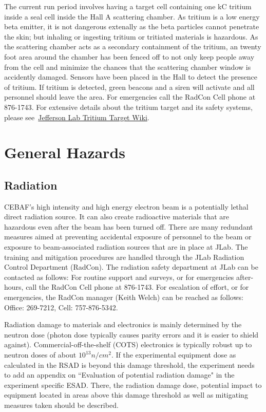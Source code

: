 The current run period involves having a target cell containing one kC tritium inside a seal cell
inside the Hall A scattering
chamber.    As tritium is a low energy beta emitter, it is not dangerous extenally as the beta particles 
cannot penetrate the skin; but inhaling or ingesting tritium or tritiated materials is hazardous. 
As the scattering chamber acts as a secondary containment of the tritium, an twenty foot area around
the chamber has been fenced off to not only keep people away from the cell and minimize the chances
that the scattering chamber window is accidently damaged.
Sensors have been placed in the Hall to detect the presence of tritium.   If tritium is detected,
green beacons and a siren will activate and all personnel should leave the area.   
For emergencies call the RadCon Cell phone at 876-1743.   For extensive details about the tritium
target and its safety systems, please 
see~\href{https://wiki.jlab.org/jlab_tritium_target_wiki/index.php/Main_Page}{Jefferson Lab Tritium Target Wiki}.


\chapter{General Hazards}

\section{Radiation}
	
CEBAF's high intensity and high energy electron beam is a potentially lethal direct radiation source. 
It can also create radioactive materials that are hazardous even  after the beam has been turned off. 
There are many redundant measures aimed at preventing accidental exposure of personnel to the beam 
or exposure to beam-associated radiation sources that are in place at JLab. The training and mitigation 
procedures are handled through the JLab Radiation Control Department (RadCon). The radiation safety 
department at JLab can be contacted as follows: For routine support and surveys, or for emergencies 
after-hours, call the RadCon Cell phone at 876-1743. For escalation of effort, or for emergencies, 
the RadCon manager (Keith Welch) can be reached as follows: Office: 269-7212, Cell: 757-876-5342.

Radiation damage to materials and electronics is mainly determined by the neutron 
dose (photon dose typically causes parity errors and it is easier to shield against). 
Commercial-off-the-shelf (COTS) electronics is typically robust up to neutron 
doses of about $10^{13} n/cm^2$. If the experimental equipment dose as calculated 
in the RSAD is beyond this damage threshold, the experiment needs to add 
an appendix on ``Evaluation of potential radiation damage" in the experiment 
specific ESAD. There, the radiation damage dose, potential impact to equipment 
located in areas above this damage threshold as well as mitigating measures taken should be described.

